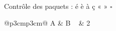 \documentclass[a4paper,11pt]{article}
\begin{document}
Contrôle des paquets : é è à ç « » \(\square\)
\begin{longtable}{@{}p{3cm}p{3cm}@{}}
\toprule A & B \ \midrule {} & 2 \
\bottomrule
\end{longtable}
\end{document}

